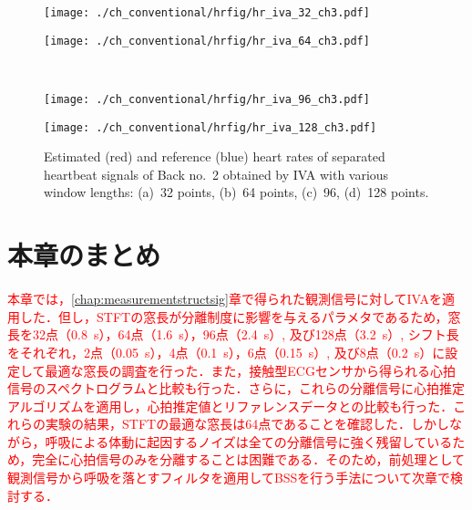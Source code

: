 \begin{figure}[htbp]
      \begin{minipage}[t]{0.45\hsize}
        \centering
        \texttt{[image: ./ch\_conventional/hrfig/hr\_iva\_32\_ch3.pdf]}
        \label{fig:hva32ch3}
      \end{minipage} 
      \begin{minipage}[t]{0.45\hsize}
        \centering
        \texttt{[image: ./ch\_conventional/hrfig/hr\_iva\_64\_ch3.pdf]}
        \label{fig:hva64ch3}
      \end{minipage} \\
   
      \begin{minipage}[t]{0.45\hsize}
        \centering
        \texttt{[image: ./ch\_conventional/hrfig/hr\_iva\_96\_ch3.pdf]}
        \label{fig:hva96ch3}
      \end{minipage} 
      \begin{minipage}[t]{0.45\hsize}
        \centering
        \texttt{[image: ./ch\_conventional/hrfig/hr\_iva\_128\_ch3.pdf]}
        \label{fig:hva128ch3}
      \end{minipage} 
     \caption{Estimated (red) and reference (blue) heart rates of separated heartbeat signals of Back no.~2 obtained by IVA with various window lengths: (a)~32 points, (b)~64 points, (c)~96, (d)~128 points.}
     \label{fig:hrivawinlen}
  \end{figure}

\section{本章のまとめ}
\textcolor{red}{本章では，\ref{chap:measurementstructsig}章で得られた観測信号に対してIVAを適用した．但し，STFTの窓長が分離制度に影響を与えるパラメタであるため，窓長を32点（0.8~s），64点（1.6~s），96点（2.4~s）, 及び128点（3.2~s）, シフト長をそれぞれ，2点（0.05~s），4点（0.1~s），6点（0.15~s）, 及び8点（0.2~s）に設定して最適な窓長の調査を行った．また，接触型ECGセンサから得られる心拍信号のスペクトログラムと比較も行った．さらに，これらの分離信号に心拍推定アルゴリズムを適用し，心拍推定値とリファレンスデータとの比較も行った．これらの実験の結果，STFTの最適な窓長は64点であることを確認した．しかしながら，呼吸による体動に起因するノイズは全ての分離信号に強く残留しているため，完全に心拍信号のみを分離することは困難である．そのため，前処理として観測信号から呼吸を落とすフィルタを適用してBSSを行う手法について次章で検討する．}


